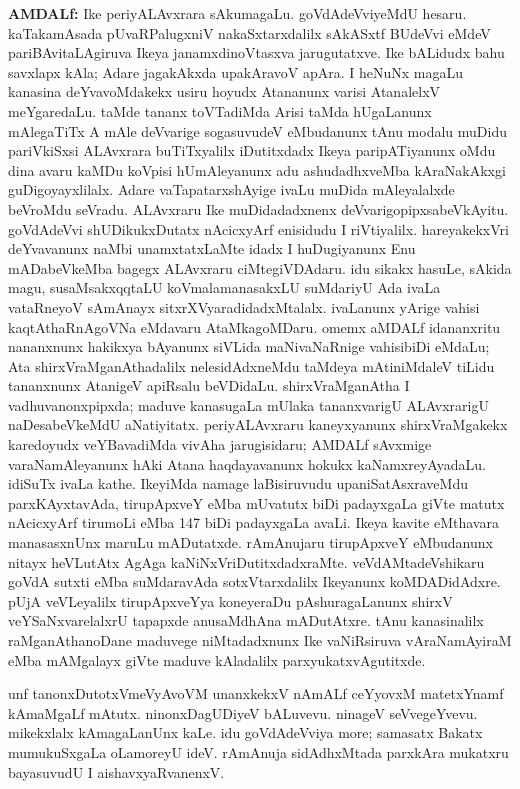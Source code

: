 {\textbf{AMDALf:}} Ike periyALAvxrara sAkumagaLu. goVdAdeVviyeMdU hesaru. kaTakamAsada pUvaRPalugxniV nakaSxtarxdalilx sAkASxtf BUdeVvi eMdeV pariBAvitaLAgiruva Ikeya janamxdinoVtasxva jarugutatxve. Ike bALidudx bahu savxlapx kAla; Adare jagakAkxda upakAravoV apAra. I heNuNx magaLu kanasina deYvavoMdakekx usiru hoyudx Atananunx varisi AtanalelxV meYgaredaLu. taMde tananx toVTadiMda Arisi taMda hUgaLanunx mAlegaTiTx A mAle deVvarige sogasuvudeV eMbudanunx tAnu modalu muDidu pariVkiSxsi ALAvxrara buTiTxyalilx iDutitxdadx Ikeya paripATiyanunx oMdu dina avaru kaMDu koVpisi hUmAleyanunx adu ashudadhxveMba kAraNakAkxgi guDigoyayxlilalx. Adare vaTapatarxshAyige ivaLu muDida mAleyalalxde beVroMdu seVradu. ALAvxraru Ike muDidadadxnenx deVvarigopipxsabeVkAyitu. goVdAdeVvi shUDikukxDutatx nAcicxyArf enisidudu I riVtiyalilx. hareyakekxVri deYvavanunx naMbi unamxtatxLaMte idadx I huDugiyanunx Enu mADabeVkeMba bagegx ALAvxraru ciMtegiVDAdaru. idu sikakx hasuLe, sAkida magu, susaMsakxqqtaLU koVmalamanasakxLU suMdariyU Ada ivaLa vataRneyoV sAmAnayx sitxrXVyaradidadxMtalalx. ivaLanunx yArige vahisi kaqtAthaRnAgoVNa eMdavaru AtaMkagoMDaru. omemx aMDALf idananxritu nananxnunx hakikxya bAyanunx siVLida maNivaNaRnige vahisibiDi eMdaLu; Ata shirxVraMganAthadalilx nelesidAdxneMdu taMdeya mAtiniMdaleV tiLidu tananxnunx AtanigeV apiRsalu beVDidaLu. shirxVraMganAtha I vadhuvanonxpipxda; maduve kanasugaLa mUlaka tananxvarigU ALAvxrarigU naDesabeVkeMdU aNatiyitatx. periyALAvxraru kaneyxyanunx shirxVraMgakekx karedoyudx veYBavadiMda vivAha jarugisidaru; AMDALf sAvxmige varaNamAleyanunx hAki Atana haqdayavanunx hokukx kaNamxreyAyadaLu. idiSuTx ivaLa kathe. IkeyiMda namage laBisiruvudu upaniSatAsxraveMdu parxKAyxtavAda, tirupApxveY eMba mUvatutx biDi padayxgaLa giVte matutx nAcicxyArf tirumoLi eMba {\rm 147} biDi padayxgaLa avaLi. Ikeya kavite eMthavara manasasxnUnx maruLu mADutatxde. rAmAnujaru tirupApxveY eMbudanunx nitayx heVLutAtx AgAga kaNiNxVriDutitxdadxraMte. veVdAMtadeVshikaru goVdA sutxti eMba suMdaravAda sotxVtarxdalilx Ikeyanunx koMDADidAdxre. pUjA veVLeyalilx tirupApxveYya koneyeraDu pAshuragaLanunx shirxV veYSaNxvarelalxrU tapapxde anusaMdhAna mADutAtxre. tAnu kanasinalilx raMganAthanoDane maduvege niMtadadxnunx Ike vaNiRsiruva vAraNamAyiraM eMba mAMgalayx giVte maduve kAladalilx parxyukatxvAgutitxde.

unf tanonxDutotxVmeVyAvoVM unanxkekxV nAmALf ceYyovxM matetxYnamf kAmaMgaLf mAtutx. ninonxDagUDiyeV bALuvevu. ninageV seVvegeYvevu. mikekxlalx kAmagaLanUnx kaLe. idu goVdAdeVviya more; samasatx Bakatx mumukuSxgaLa oLamoreyU ideV. rAmAnuja sidAdhxMtada parxkAra mukatxru bayasuvudU I aishavxyaRvanenxV.

